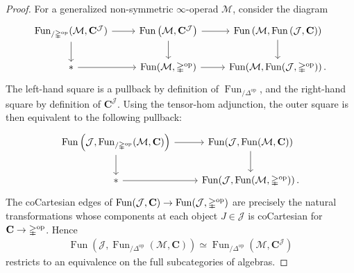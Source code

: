 \documentclass[10pt]{amsart}
\numberwithin{equation}{section}
\theoremstyle{definition}
\DeclareMathOperator{\Fun}{Fun}
\DeclareMathOperator{\op}{op}
\newcommand{\Simp}{\mathbb{\Delta}}
\newcommand{\cJ}{\mathcal{J}}
\newcommand{\cM}{\mathcal{M}}
\newcommand{\bfC}{\mathbf{C}}
\renewcommand{\to}{\mathchoice{\longrightarrow}{\rightarrow}{}{}}
\begin{document}
	\begin{proof}
		For a generalized non-symmetric $\infty$-operad $\cM$, consider the diagram
		\begin{equation*}
			\begin{tikzcd}
				\Fun_{/\Simp^{\op}}(\cM, \bfC^{\cJ}) \arrow[r] \arrow[d]      &    \Fun\left(\cM, \bfC^{\cJ} \right) \arrow[d] \arrow[r] & \Fun\left(\cM, \Fun\left(\cJ, \bfC \right) \right) \arrow[d] \\
				\ast \arrow[r]                & \Fun(\cM, \Simp^{\op} ) \arrow[r] & \Fun(\cM, \Fun(\cJ, \Simp^{\op})) \,.
			\end{tikzcd}
		\end{equation*}
		The left-hand square is a pullback by definition of $\Fun_{/\Simp^{\op}}$, and the right-hand square by definition of $\bfC^{\cJ}$.
		Using the tensor-hom adjunction, the outer square is then equivalent to the following pullback:
		\begin{equation*}
			\begin{tikzcd}
				\Fun\left(\cJ, \Fun_{/\Simp^{\op}}(\cM, \bfC) \right) \arrow[r] \arrow[d]      &  \Fun(\cJ, \Fun(\cM, \bfC))   \arrow[d] \\
				\ast \arrow[r]                & \Fun(\cJ, \Fun(\cM, \Simp^{\op})) \,.
			\end{tikzcd}
		\end{equation*}
		The coCartesian edges of $\Fun(\cJ, \bfC) \to \Fun(\cJ, \Simp^{\op})$ are precisely the natural transformations whose components at each object $J \in \cJ$ is coCartesian for $\bfC\to \Simp^{\op}$.
		Hence
		\begin{align*}
			\Fun\left(\cJ, \Fun_{/\Simp^{\op}}(\cM, \bfC) \right) \simeq \Fun_{/\Simp^{\op}}(\cM, \bfC^{\cJ} )
		\end{align*}
		restricts to an equivalence on the full subcategories of algebras.
	\end{proof}
\end{document}
